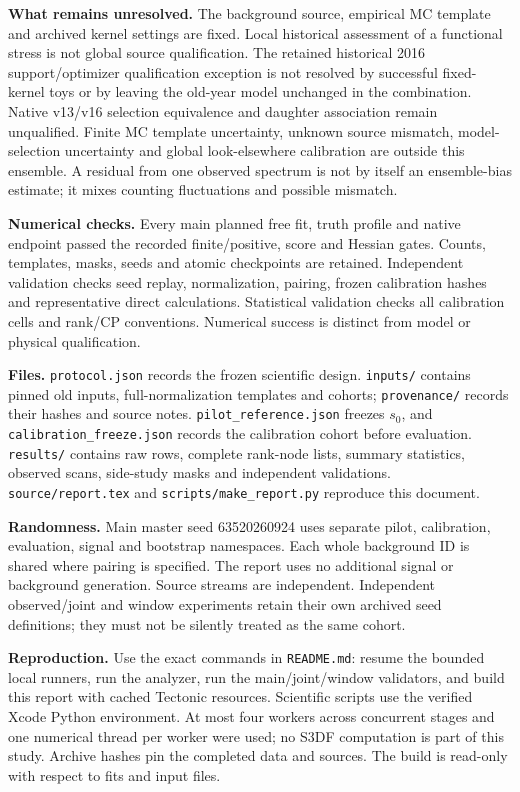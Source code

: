\documentclass[10pt]{article}
\begin{document}
\textbf{What remains unresolved.} The background source, empirical MC template and archived kernel settings are fixed. Local historical assessment of a functional stress is not global source qualification. The retained historical 2016 support/optimizer qualification exception is not resolved by successful fixed-kernel toys or by leaving the old-year model unchanged in the combination. Native v13/v16 selection equivalence and daughter association remain unqualified. Finite MC template uncertainty, unknown source mismatch, model-selection uncertainty and global look-elsewhere calibration are outside this ensemble. A residual from one observed spectrum is not by itself an ensemble-bias estimate; it mixes counting fluctuations and possible mismatch.

\textbf{Numerical checks.} Every main planned free fit, truth profile and native endpoint passed the recorded finite/positive, score and Hessian gates. Counts, templates, masks, seeds and atomic checkpoints are retained. Independent validation checks seed replay, normalization, pairing, frozen calibration hashes and representative direct calculations. Statistical validation checks all calibration cells and rank/CP conventions. Numerical success is distinct from model or physical qualification.

\textbf{Files.} \texttt{protocol.json} records the frozen scientific design. \texttt{inputs/} contains pinned old inputs, full-normalization templates and cohorts; \texttt{provenance/} records their hashes and source notes. \texttt{pilot\_reference.json} freezes $s_0$, and \texttt{calibration\_freeze.json} records the calibration cohort before evaluation. \texttt{results/} contains raw rows, complete rank-node lists, summary statistics, observed scans, side-study masks and independent validations. \texttt{source/report.tex} and \texttt{scripts/make\_report.py} reproduce this document.

\textbf{Randomness.} Main master seed 63520260924 uses separate pilot, calibration, evaluation, signal and bootstrap namespaces. Each whole background ID is shared where pairing is specified. The report uses no additional signal or background generation. Source streams are independent. Independent observed/joint and window experiments retain their own archived seed definitions; they must not be silently treated as the same cohort.

\textbf{Reproduction.} Use the exact commands in \texttt{README.md}: resume the bounded local runners, run the analyzer, run the main/joint/window validators, and build this report with cached Tectonic resources. Scientific scripts use the verified Xcode Python environment. At most four workers across concurrent stages and one numerical thread per worker were used; no S3DF computation is part of this study. Archive hashes pin the completed data and sources. The build is read-only with respect to fits and input files.
\end{document}
